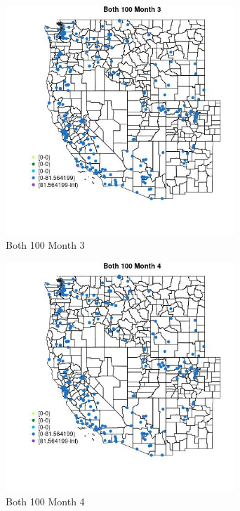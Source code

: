 \begin{figure} 
\centering  
\includegraphics[width=0.77\textwidth]{Code_Outputs/Report_ML_input_PM25_Step4_part_e_de_duplicated_aveswNAs_MapObsMo3Both_100.jpg} 
\caption{\label{fig:Report_ML_input_PM25_Step4_part_e_de_duplicated_aveswNAsMapObsMo3Both_100}Both 100 Month 3} 
\end{figure} 
 

\clearpage 

\begin{figure} 
\centering  
\includegraphics[width=0.77\textwidth]{Code_Outputs/Report_ML_input_PM25_Step4_part_e_de_duplicated_aveswNAs_MapObsMo4Both_100.jpg} 
\caption{\label{fig:Report_ML_input_PM25_Step4_part_e_de_duplicated_aveswNAsMapObsMo4Both_100}Both 100 Month 4} 
\end{figure} 
 

